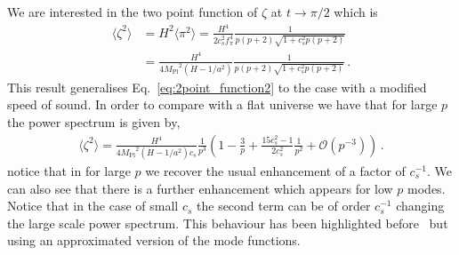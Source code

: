 \documentclass[a4paper,11pt]{article}
\numberwithin{equation}{section}
\newcommand{\mpl}{{M_{\mathrm{Pl}}}}
\numberwithin{equation}{section}
\begin{document}
We are interested in the two point function of $\zeta$ at $t\to\pi/2$ which is  
\begin{align}
\langle\zeta^2\rangle&=H^2\langle\pi^2\rangle=\frac{H^4}{2c_s^2 f_\pi^4}\frac{1}{p(p+2)\sqrt{1+c_s^2 p (p+2)}}\nonumber\\
&=
\frac{H^4}{4 \mpl^2(\dot H-1/a^2)}\frac{1}{p(p+2)\sqrt{1+c_s^2 p(p+2)}} \,.
\end{align}
This result generalises Eq.~\eqref{eq:2point_function2} to the case with a modified speed of sound. In order to compare with a flat universe we have that for large $p$ the power spectrum is given by,
\begin{align}
\langle\zeta^2\rangle= \frac{H^4}{4\mpl^2(\dot H-1/a^2)c_s}\frac{1}{p^3}\left(1-\frac{3}{p}+\frac{15 c_s^2-1}{2c_s^2}\frac{1}{p^2}+\mathcal{O}\left(p^{-3}\right)\right) \,.
\end{align}  notice that in for large $p$ we recover the usual  enhancement of  a factor of $c_s^{-1}$. We can also see that there is a further enhancement which appears  for low $p$ modes. Notice that in the case of small $c_s$ the second term can be of order $c_s^{-1}$ changing the large scale power spectrum. This behaviour  has been highlighted before~\cite{Avis:2019eav} but using an approximated version of the mode functions. 
\end{document}
